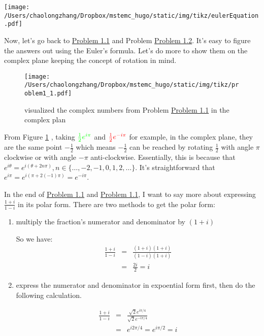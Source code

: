 \documentclass[koma,a4paper,utopia,12pt,listings-color,microtype,paralist,colorlinks,urlcolor=red]{org-article}
\begin{document}
\begin{center}
\texttt{[image: /Users/chaolongzhang/Dropbox/mstemc\_hugo/static/img/tikz/eulerEquation.pdf]}
\end{center}

Now, let's go back to \hyperref[prob11]{Problem 1.1} and Problem \hyperref[prob12]{Problem
1.2}. It's easy to figure the answers out using the Euler's formula. Let's do
more to show them on the complex plane keeping the concept of rotation in mind.

\begin{figure}[htbp]
\centering
\texttt{[image: /Users/chaolongzhang/Dropbox/mstemc\_hugo/static/img/tikz/problem1\_1.pdf]}
\caption{\label{problem1-1}
visualized the complex numbers from Problem \hyperref[prob11]{Problem 1.1} in the complex plan}
\end{figure}

From Figure \ref{problem1-1} , taking \(\color{green}{\tfrac{1}{2}e^{i\pi}}\) and
\(\color{red}{\tfrac{1}{2}e^{-i\pi}}\) for example, in the complex plane, they
are the same point \(-\tfrac{1}{2}\) which means \(-\tfrac{1}{2}\) can be
reached by rotating \(\tfrac{1}{2}\) with angle \(\pi\) clockwise or with angle
\(-\pi\) anti-clockwise. Essentially, this is because that \(e^{i\theta} =
e^{i(\theta + 2n\pi)}, n\in \{\ldots,-2,-1,0,1,2,\ldots\}\). It's
straightforward that \(e^{i\pi} = e^{i(\pi + 2(-1)\pi)} = e^{-i\pi}\).

In the end of \hyperref[prob11]{Problem 1.1} and \hyperref[prob11]{Problem 1.1}, I want to say
more about expressing \(\tfrac{1+i}{1-i}\) in its polar form. There are two
methods to get the polar form:
\begin{enumerate}
\item multiply the fraction's numerator and denominator by \(( 1 + i )\)

So we have:
\begin{eqnarray*}
\frac{1+i}{1-i}& = & \frac{(1+i)(1+i)}{(1-i)(1+i)} \\
&=& \frac{2i}{2} = i
\end{eqnarray*}

\item express the numerator and denominator in expoential form first, then do the
following calculation.

\begin{eqnarray*}
\frac{1+i}{1-i} &=& \frac{\sqrt{2}e^{i\pi/4}}{\sqrt{2}e^{-i\pi/4}}  \\
&=& e^{i2\pi/4} = e^{i\pi/2} = i
\end{eqnarray*}
\end{enumerate}
\end{document}
